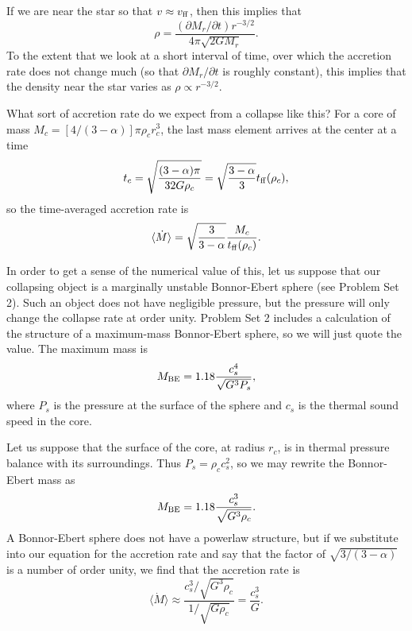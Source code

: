 If we are near the star so that $v\approx v_{\rm ff}$, then this implies that
\begin{equation}
\rho = \frac{(\partial M_r/\partial t) r^{-3/2}}{4\pi\sqrt{2 G M_r}}.
\end{equation}
To the extent that we look at a short interval of time, over which the accretion rate does not change much (so that $\partial M_r /\partial t$ is roughly constant), this implies that the density near the star varies as $\rho\propto r^{-3/2}$.

What sort of accretion rate do we expect from a collapse like this? For a core of mass $M_c = [4/(3-\alpha)]\pi \rho_c r_c^3$, the last mass element arrives at the center at a time
\begin{equation}
t_c = \sqrt{\frac{(3-\alpha)\pi}{32 G \rho_c}} = \sqrt{\frac{3-\alpha}{3}}t_{\rm ff}(\rho_c),
\end{equation}
so the time-averaged accretion rate is
\begin{equation}
\langle\dot{M}\rangle = \sqrt{\frac{3}{3-\alpha}} \frac{M_c}{t_{\rm ff}(\rho_c)}.
\end{equation}

In order to get a sense of the numerical value of this, let us suppose that our collapsing object is a marginally unstable Bonnor-Ebert sphere (see Problem Set 2). Such an object does not have negligible pressure, but the pressure will only change the collapse rate at order unity. Problem Set 2 includes a calculation of the structure of a maximum-mass Bonnor-Ebert sphere, so we will just quote the value. The maximum mass is
\begin{equation}
M_{\rm BE} = 1.18 \frac{c_s^4}{\sqrt{G^3 P_s}},
\end{equation}
where $P_s$ is the pressure at the surface of the sphere and $c_s$ is the thermal sound speed in the core.

Let us suppose that the surface of the core, at radius $r_c$, is in thermal pressure balance with its surroundings. Thus $P_s = \rho_c c_s^2$, so we may rewrite the Bonnor-Ebert mass as
\begin{equation}
M_{\rm BE} = 1.18 \frac{c_s^3}{\sqrt{G^3 \rho_c}}.
\end{equation}
A Bonnor-Ebert sphere does not have a powerlaw structure, but if we substitute into our equation for the accretion rate and say that the factor of $\sqrt{3/(3-\alpha)}$ is a number of order unity, we find that the accretion rate is
\begin{equation}
\langle\dot{M}\rangle \approx \frac{c_s^3/\sqrt{G^3\rho_c}}{1/\sqrt{G\rho_c}} = \frac{c_s^3}{G}.
\end{equation}

